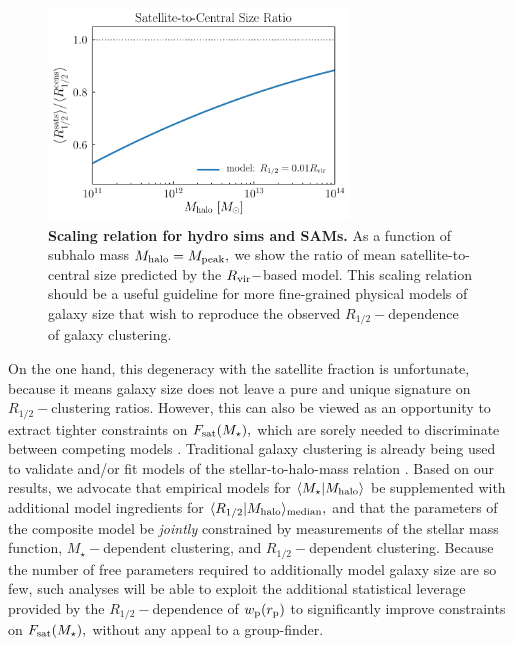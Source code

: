 \documentclass[usenatbib,usegraphicx,letterpaper]{mn2e}
\newcommand{\rhalf}{R_{1/2}}
\newcommand{\mstar}{M_{\star}}
\newcommand{\mpeak}{M_{\rm peak}}
\newcommand{\mhalo}{M_{\rm halo}}
\newcommand{\rvir}{R_{\rm vir}}
\newcommand{\rproj}{r_{\rm p}}
\newcommand{\wproj}{w_{\rm p}}
\newcommand{\mean}[2]{\langle{#1}\vert{#2}\rangle}
\newcommand{\median}[2]{\langle{#1}\vert{#2}\rangle_{\rm median}}
\begin{document}
\begin{figure}
\centering
\includegraphics[width=8cm]{FIGS/cen_sat_size_ratios.pdf}
\caption{
{\bf Scaling relation for hydro sims and SAMs.}
As a function of subhalo mass $\mhalo=\mpeak,$ we show the ratio of mean satellite-to-central size predicted by the $\rvir-$based model. This scaling relation should be a useful guideline for more fine-grained physical models of galaxy size that wish to reproduce the observed $\rhalf-$dependence of galaxy clustering.
}
\label{fig:censatsizeratios}
\end{figure}

On the one hand, this degeneracy with the satellite fraction is unfortunate, because it means galaxy size does not leave a pure and unique signature on $\rhalf-$clustering ratios. However, this can also be viewed as an opportunity to extract tighter constraints on $F_{\rm sat}(\mstar),$ which are sorely needed to discriminate between competing models \citep{watson_conroy13}. Traditional galaxy clustering is already being used to validate and/or fit models of the stellar-to-halo-mass relation \citep[e.g.,][]{leauthaud_etal11,moster_etal10,behroozi13_smhm,lehmann_etal15}. Based on our results, we advocate that empirical models for $\mean{\mstar}{\mhalo}$ be supplemented with additional model ingredients for $\median{\rhalf}{\mhalo},$ and that the parameters of the composite model be {\em jointly} constrained by measurements of the stellar mass function, $\mstar-$dependent clustering, and $\rhalf-$dependent clustering. Because the number of free parameters required to additionally model galaxy size are so few, such analyses will be able to exploit the additional statistical leverage provided by the $\rhalf-$dependence of $\wproj(\rproj)$ to significantly improve constraints on $F_{\rm sat}(\mstar),$ without any appeal to a group-finder.
\end{document}
